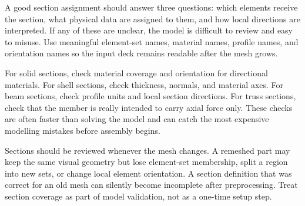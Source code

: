 A good section assignment should answer three questions: which elements receive the section, what physical data are assigned to them, and how local directions are interpreted. If any of these are unclear, the model is difficult to review and easy to misuse. Use meaningful element-set names, material names, profile names, and orientation names so the input deck remains readable after the mesh grows.

For solid sections, check material coverage and orientation for directional materials. For shell sections, check thickness, normals, and material axes. For beam sections, check profile units and local section directions. For truss sections, check that the member is really intended to carry axial force only. These checks are often faster than solving the model and can catch the most expensive modelling mistakes before assembly begins.

Sections should be reviewed whenever the mesh changes. A remeshed part may keep the same visual geometry but lose element-set membership, split a region into new sets, or change local element orientation. A section definition that was correct for an old mesh can silently become incomplete after preprocessing. Treat section coverage as part of model validation, not as a one-time setup step.
